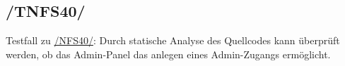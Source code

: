 \subsection*{/TNFS40/}

\label{/TNFS40/} Testfall zu \hyperref[/NFS40/]{/NFS40/}: Durch \gls{statische Analyse} des \Gls{Quellcode}s kann überprüft werden, ob das \Gls{Admin-Panel} das anlegen eines \Gls{Admin-Zugang}s ermöglicht.